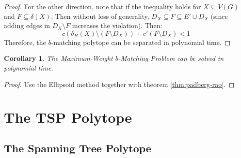 \documentclass[11pt, a4paper]{article}
\newtheorem{cor}[theorem]{Corollary}
\theoremstyle{remark}
\theoremstyle{definition}
\begin{document}
\begin{proof}
	For the other direction, note that if the inequality holds for
	$X\subseteq V(G)$ and $F\subseteq \delta(X)$. Then without loss of
	generality, $D_X\subseteq F\subseteq E'\cup D_X$ (since adding edges
	in $D_X\setminus F$ increases the violation). Then:
	\[c(\delta_H(X)\setminus (F\setminus D_X))+c'(F\setminus D_X)<1\]
	Therefore, the $b$-matching polytope can be separated in polynomial
	time.
\end{proof}


\begin{cor}
	The Maximum-Weight $b$-Matching Problem can be solved in polynomial time.
\end{cor}
\begin{proof}
	Use the Ellipsoid method together with theorem \ref{thm:padberg-rao}.
\end{proof}

\section{The TSP Polytope}
\subsection{The Spanning Tree Polytope}
\end{document}
